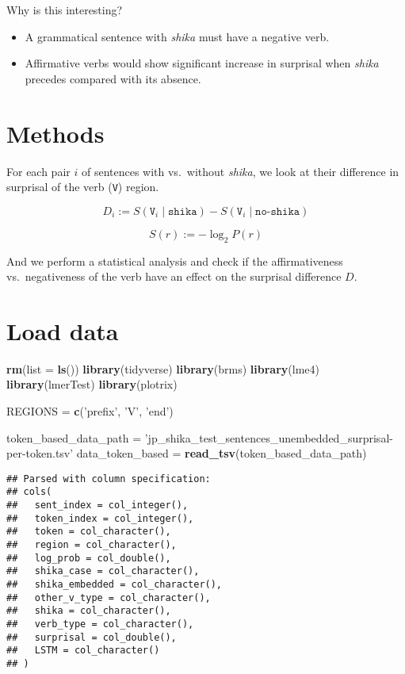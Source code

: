 \documentclass[]{ltjsarticle}
\newenvironment{Shaded}{\begin{snugshade}}{\end{snugshade}}
\newcommand{\KeywordTok}[1]{\textcolor[rgb]{0.13,0.29,0.53}{\textbf{#1}}}
\newcommand{\DataTypeTok}[1]{\textcolor[rgb]{0.13,0.29,0.53}{#1}}
\newcommand{\StringTok}[1]{\textcolor[rgb]{0.31,0.60,0.02}{#1}}
\newcommand{\NormalTok}[1]{#1}
\providecommand{\tightlist}{%
  \setlength{\itemsep}{0pt}\setlength{\parskip}{0pt}}
\begin{document}
Why is this interesting?

\begin{itemize}
\tightlist
\item
  A grammatical sentence with \emph{shika} must have a negative verb.
\item
  Affirmative verbs would show significant increase in surprisal when
  \emph{shika} precedes compared with its absence.
\end{itemize}

\section{Methods}\label{methods}

For each pair \(i\) of sentences with vs.~without \emph{shika}, we look
at their difference in surprisal of the verb (\texttt{V}) region.

\[
D_i
     := 
        S(\texttt{V}_i \mid \texttt{shika})
        -
        S(\texttt{V}_i \mid \texttt{no-shika})
\]

\[
S(r) := - \log_2 P(r)
\]

And we perform a statistical analysis and check if the affirmativeness
vs.~negativeness of the verb have an effect on the surprisal difference
\(D\).

\section{Load data}\label{load-data}

\begin{Shaded}
\begin{Highlighting}[]
\KeywordTok{rm}\NormalTok{(}\DataTypeTok{list =} \KeywordTok{ls}\NormalTok{())}
\KeywordTok{library}\NormalTok{(tidyverse)}
\KeywordTok{library}\NormalTok{(brms)}
\KeywordTok{library}\NormalTok{(lme4)}
\KeywordTok{library}\NormalTok{(lmerTest)}
\KeywordTok{library}\NormalTok{(plotrix)}


\NormalTok{REGIONS =}\StringTok{ }\KeywordTok{c}\NormalTok{(}\StringTok{'prefix'}\NormalTok{, }\StringTok{'V'}\NormalTok{, }\StringTok{'end'}\NormalTok{)}


\NormalTok{token_based_data_path =}\StringTok{ 'jp_shika_test_sentences_unembedded_surprisal-per-token.tsv'}
\NormalTok{data_token_based =}\StringTok{ }\KeywordTok{read_tsv}\NormalTok{(token_based_data_path)}
\end{Highlighting}
\end{Shaded}

\begin{verbatim}
## Parsed with column specification:
## cols(
##   sent_index = col_integer(),
##   token_index = col_integer(),
##   token = col_character(),
##   region = col_character(),
##   log_prob = col_double(),
##   shika_case = col_character(),
##   shika_embedded = col_character(),
##   other_v_type = col_character(),
##   shika = col_character(),
##   verb_type = col_character(),
##   surprisal = col_double(),
##   LSTM = col_character()
## )
\end{verbatim}
\end{document}
